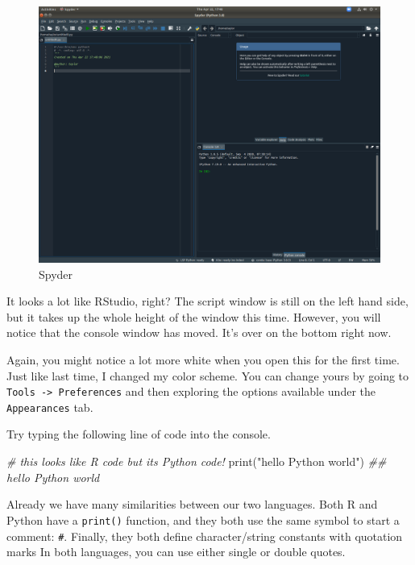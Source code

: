 \documentclass[
  12pt,
  krantz2]{krantz}
\makeatletter
\newenvironment{Shaded}{\begin{snugshade}}{\end{snugshade}}
\newcommand{\BuiltInTok}[1]{#1}
\newcommand{\CommentTok}[1]{\textcolor[rgb]{0.37,0.37,0.37}{\textit{#1}}}
\newcommand{\NormalTok}[1]{#1}
\newcommand{\StringTok}[1]{\textcolor[rgb]{0.5,0.5,0.5}{#1}}
\newenvironment{kframe}{%
\medskip{}
\setlength{\fboxsep}{.8em}
 \def\at@end@of@kframe{}%
 \ifinner\ifhmode%
  \def\at@end@of@kframe{\end{minipage}}%
  \begin{minipage}{\columnwidth}%
 \fi\fi%
 \def\FrameCommand##1{\hskip\@totalleftmargin \hskip-\fboxsep
 \colorbox{shadecolor}{##1}\hskip-\fboxsep
     \hskip-\linewidth \hskip-\@totalleftmargin \hskip\columnwidth}%
 \MakeFramed {\advance\hsize-\width
   \@totalleftmargin\z@ \linewidth\hsize
   \@setminipage}}%
 {\par\unskip\endMakeFramed%
 \at@end@of@kframe}
\renewenvironment{Shaded}{\begin{kframe}}{\end{kframe}}
\makeatother
\begin{document}
\begin{figure}

{\centering \includegraphics[width=0.8\linewidth]{pics/spyder_screenshot} 

}

\caption{Spyder}\label{fig:spyder}
\end{figure}

It looks a lot like RStudio, right? The script window  is still on the left hand side, but it takes up the whole height of the window this time. However, you will notice that the console window has moved. It's over on the bottom right now.

Again, you might notice a lot more white when you open this for the first time. Just like last time, I changed my color scheme. You can change yours by going to \texttt{Tools\ -\textgreater{}\ Preferences} and then exploring the options available under the \texttt{Appearances} tab.

Try typing the following line of code into the console.

\begin{Shaded}
\begin{Highlighting}[]
\CommentTok{\# this looks like R code but it\textquotesingle{}s Python code!}
\BuiltInTok{print}\NormalTok{(}\StringTok{"hello Python world"}\NormalTok{)}
\CommentTok{\#\# hello Python world}
\end{Highlighting}
\end{Shaded}

Already we have many similarities between our two languages. Both R and Python have a \texttt{print()} function, and they both use the same symbol to start a comment: \texttt{\#}. Finally, they both define character/string constants with quotation marks In both languages, you can use either single or double quotes.
\end{document}

